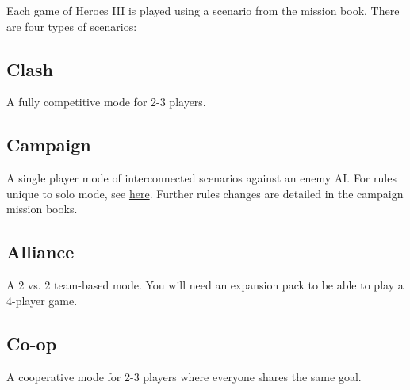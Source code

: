 Each game of Heroes III is played using a scenario from the mission book.
There are four types of scenarios:

\subsection*{Clash}
A fully competitive mode for 2-3 players.

\subsection*{Campaign}
A single player mode of interconnected scenarios against an enemy AI.
For rules unique to solo mode, see \hyperlink{AIrules}{here}.
Further rules changes are detailed in the campaign mission books.

\subsection*{Alliance}
A 2 vs.
2 team-based mode.
You will need an expansion pack to be able to play a 4-player game.

\subsection*{Co-op}
A cooperative mode for 2-3 players where everyone shares the same goal.

\clearpage
